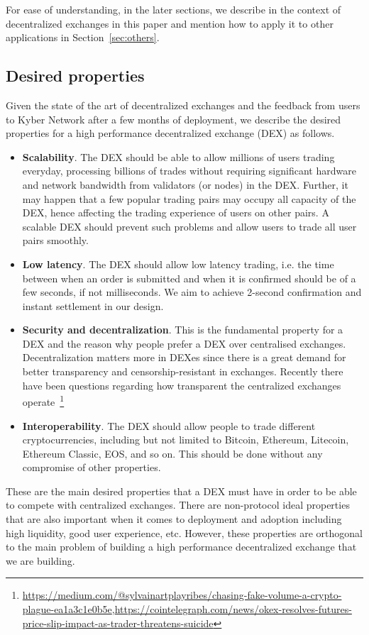 For ease of understanding, in the later sections, we describe \codename in the context of decentralized exchanges in this paper and mention how to apply it to other applications in Section~\ref{sec:others}.

\subsection{Desired properties}
Given the state of the art of decentralized exchanges and the feedback from users to Kyber Network after a few months of deployment, we describe the desired properties for a high performance decentralized exchange (DEX) as follows.

\begin{itemize}
\item \textbf{Scalability}. The DEX should be able to allow millions of users trading everyday, processing billions of trades without requiring significant hardware and network bandwidth from validators (or nodes) in the DEX. Further, it may happen that a few popular trading pairs may occupy all capacity of the DEX, hence affecting the trading experience of users on other pairs. A scalable DEX should prevent such problems and allow users to trade all user pairs smoothly.
\item \textbf{Low latency}. The DEX should allow low latency trading, i.e. the time between when an order is submitted and when it is confirmed should be of a few seconds, if not milliseconds. We aim to achieve 2-second confirmation and instant settlement in our design.

\item \textbf{Security and decentralization}. This is the fundamental property for a DEX and the reason why people prefer a DEX over centralised exchanges. Decentralization matters more in DEXes since there is a great demand for better transparency and censorship-resistant in exchanges. Recently there have been questions regarding how transparent the centralized exchanges operate~\footnote{\url{https://medium.com/@sylvainartplayribes/chasing-fake-volume-a-crypto-plague-ea1a3c1e0b5e},\newline \url{https://cointelegraph.com/news/okex-resolves-futures-price-slip-impact-as-trader-threatens-suicide}}

\item \textbf{Interoperability}. The DEX should allow people to trade different cryptocurrencies, including but not limited to Bitcoin, Ethereum, Litecoin, Ethereum Classic, EOS, and so on. This should be done without any compromise of other properties.
\end{itemize}
These are the main desired properties that a DEX must have in order to be able to compete with centralized exchanges. There are non-protocol ideal properties that are also important when it comes to deployment and adoption including high liquidity, good user experience, etc. However, these properties are orthogonal to the main problem of building a high performance decentralized exchange that we are building.

